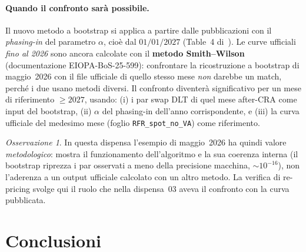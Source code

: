 \documentclass[11pt,a4paper]{article}
\theoremstyle{plain}
\theoremstyle{definition}
\theoremstyle{remark}
\newtheorem*{osservazione}{Osservazione}
\begin{document}
\paragraph{Quando il confronto sar\`a possibile.}
Il nuovo metodo a bootstrap si applica a partire dalle pubblicazioni con il \emph{phasing-in}
del parametro $\alpha$, cio\`e dal \textbf{$01/01/2027$} (Table~4 di~\cite{eiopa2026}). Le
curve ufficiali \emph{fino al 2026} sono ancora calcolate con il \textbf{metodo Smith--Wilson}
(documentazione EIOPA-BoS-25-599): confrontare la ricostruzione a bootstrap di maggio~2026 con
il file ufficiale di quello stesso mese \emph{non} darebbe un match, perch\'e i due usano
metodi diversi. Il confronto diventer\`a significativo per un mese di riferimento
$\ge 2027$, usando: (i) i par swap DLT di quel mese after-CRA come input del bootstrap, (ii)
$\alpha$ del phasing-in dell'anno corrispondente, e (iii) la curva ufficiale del medesimo mese
(foglio \texttt{RFR\_spot\_no\_VA}) come riferimento.

\begin{osservazione}
In questa dispensa l'esempio di maggio~2026 ha quindi valore \emph{metodologico}: mostra il
funzionamento dell'algoritmo e la sua coerenza interna (il bootstrap riprezza i par osservati
a meno della precisione macchina, $\sim 10^{-16}$), non l'aderenza a un output ufficiale
calcolato con un altro metodo. La verifica di re-pricing svolge qui il ruolo che nella
dispensa~03 aveva il confronto con la curva pubblicata.
\end{osservazione}

\section{Conclusioni}
\label{sec:conclusioni}
\end{document}

